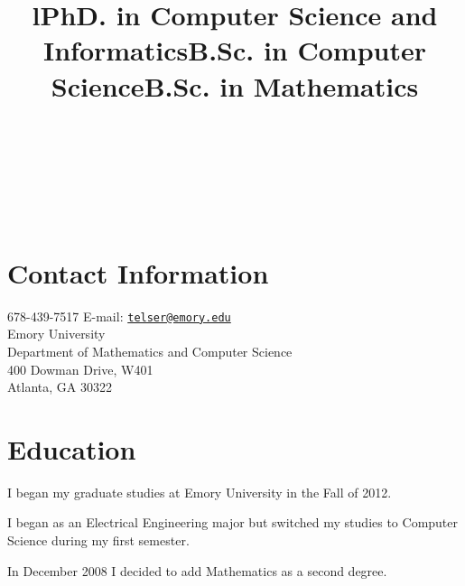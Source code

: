 \documentclass[margintitle,line]{res}
\begin{document}

\begin{resume}

\begin{format}
\\
\title{l}\\
\body\\
\end{format}



\section{Contact Information}

678-439-7517 \hfill {E-mail:} \href{mailto:telser@emory.edu}{\nolinkurl{telser@emory.edu}} \\
Emory University \\
Department of Mathematics and Computer Science \\
400 Dowman Drive, W401 \\
Atlanta, GA 30322


\section{Education}

\title{PhD. in Computer Science and Informatics}
\begin{position}
I began my graduate studies at Emory University in the Fall of 2012.
\end{position}

\title{B.Sc. in Computer Science}
\begin{position}
  I began as an Electrical Engineering major but switched my studies to Computer Science during my first semester. 
\end{position}


\title{B.Sc. in Mathematics}
\begin{position}
   In December 2008 I decided to add Mathematics as a second degree.
\end{position}


\end{resume}
\end{document}
